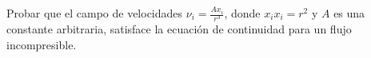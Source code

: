 \documentclass[../main.tex]{subfiles}
\begin{document}
\begin{problema}
	Probar que el campo de velocidades \(\nu_{i} = \tfrac{Ax_{i}}{r^{3}}\),
	donde \(x_{i}x_{i} = r^{2}\) y \(A\) es una constante arbitraria,
	satisface la ecuación de continuidad para un flujo incompresible.
\end{problema}
\end{document}
